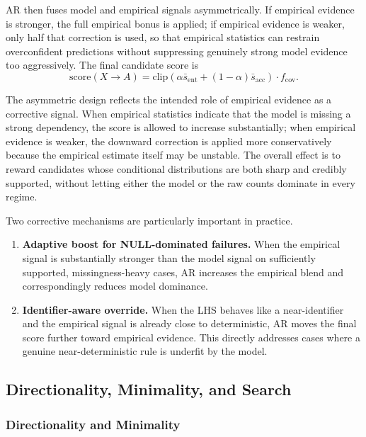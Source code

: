 \documentclass[conference]{IEEEtran}
\begin{document}
AR then fuses model and empirical signals asymmetrically. If empirical evidence is stronger, the full empirical bonus is applied; if empirical evidence is weaker, only half that correction is used, so that empirical statistics can restrain overconfident predictions without suppressing genuinely strong model evidence too aggressively. The final candidate score is
\begin{equation}
    \mathrm{score}(X \to A) = \mathrm{clip}\!\left(\alpha \bar{s}_{\mathrm{ent}} + (1-\alpha)\bar{s}_{\mathrm{acc}}\right)\cdot f_{\mathrm{cov}}.
\end{equation}

The asymmetric design reflects the intended role of empirical evidence as a corrective signal. When empirical statistics indicate that the model is missing a strong dependency, the score is allowed to increase substantially; when empirical evidence is weaker, the downward correction is applied more conservatively because the empirical estimate itself may be unstable. The overall effect is to reward candidates whose conditional distributions are both sharp and credibly supported, without letting either the model or the raw counts dominate in every regime.

Two corrective mechanisms are particularly important in practice.
\begin{enumerate}
    \item \textbf{Adaptive boost for NULL-dominated failures.} When the empirical signal is substantially stronger than the model signal on sufficiently supported, missingness-heavy cases, AR increases the empirical blend and correspondingly reduces model dominance.
    \item \textbf{Identifier-aware override.} When the LHS behaves like a near-identifier and the empirical signal is already close to deterministic, AR moves the final score further toward empirical evidence. This directly addresses cases where a genuine near-deterministic rule is underfit by the model.
\end{enumerate}

\subsection{Directionality, Minimality, and Search}\label{sec:search}

\subsubsection{Directionality and Minimality}
\end{document}
